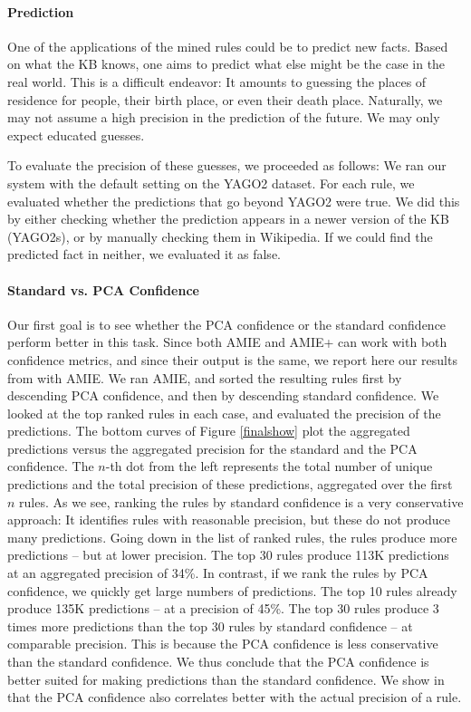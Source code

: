 \paragraph{Prediction} One of the applications of the mined rules could be to predict new facts.
Based on what the KB knows, one aims to predict what else might be the case in the real world.
This is a difficult endeavor: It amounts to guessing the places of residence for people, their birth place, or even their death place.
Naturally, we may not assume a high precision in the prediction of the future. We may only expect educated guesses.

To evaluate the precision of these guesses, we proceeded as follows:
We ran our system with the default setting on the YAGO2 dataset.
For each rule, we evaluated whether the predictions that go beyond YAGO2 were true.
We did this by either checking whether the prediction appears in a newer version of the KB (YAGO2s),
or by manually checking them in Wikipedia. If we could find the predicted fact in neither, we evaluated it as false.

\paragraph{Standard vs. PCA Confidence} Our first goal is to see whether the PCA confidence or the standard confidence perform better in this task.
Since both AMIE and AMIE+ can work with both confidence metrics, and since their output is the same, we report here our results from \cite{amie} with AMIE.
We ran AMIE, and sorted the resulting rules first by descending PCA confidence, and then by descending standard confidence.
We looked at the top ranked rules in each case, and evaluated the precision of the predictions.
The bottom curves of Figure \ref{finalshow} plot the aggregated predictions versus the aggregated precision for the standard and the PCA confidence.
The $n$-th dot from the left represents the total number of unique predictions and the total precision of these predictions,
aggregated over the first $n$ rules.
As we see, ranking the rules by standard confidence is a very conservative approach:
It identifies rules with reasonable precision, but these do not produce many predictions.
Going down in the list of ranked rules, the rules produce more predictions -- but at lower precision.
The top 30 rules produce 113K predictions at an aggregated precision of 34\%.
In contrast, if we rank the rules by PCA confidence, we quickly get large numbers of predictions. The top 10 rules already produce 135K predictions -- at a precision of 45\%.
The top 30 rules produce 3 times more predictions than the top 30 rules by standard confidence -- at comparable precision.
This is because the PCA confidence is less conservative than the standard confidence.
We thus conclude that the PCA confidence is better suited for making predictions than the standard confidence.
We show in \cite{amie} that the PCA confidence also correlates better with the actual precision of a rule.

